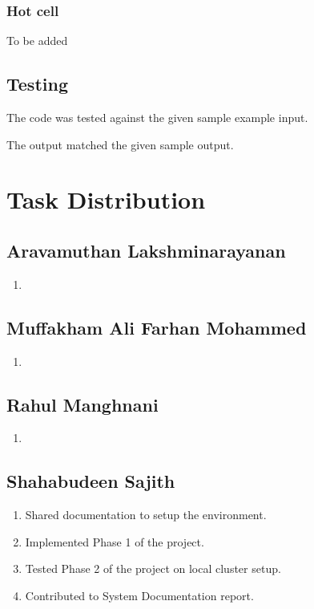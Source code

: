 \subsubsection{Hot cell}
To be added

\subsection{Testing}
The code was tested against the given sample example input.


The output matched the given sample output.

\newpage

\section{Task Distribution}

\subsection{Aravamuthan Lakshminarayanan}
\begin{enumerate}
    \item 
\end{enumerate}

\subsection{Muffakham Ali Farhan Mohammed}
\begin{enumerate}
    \item 
\end{enumerate}

\subsection{Rahul Manghnani}
\begin{enumerate}
    \item 
\end{enumerate}

\subsection{Shahabudeen Sajith}
\begin{enumerate}
    \item Shared documentation to setup the environment.
    \item Implemented Phase 1 of the project.
    \item Tested Phase 2 of the project on local cluster setup.
    \item Contributed to System Documentation report.
\end{enumerate}

